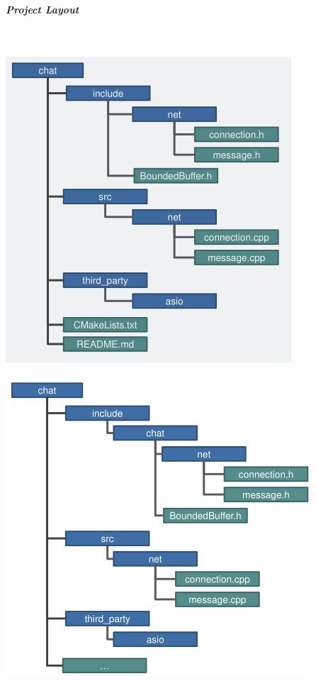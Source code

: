 \documentclass[11pt,twoside,landscape]{article}
\begin{document}
\begin{multicols}{2}
\subparagraph{Project Layout} \
\label{sec:orga0b30ba}
{
\begin{center}
\includegraphics[width=.9\linewidth]{img/cpp_project_layout_app.png}
\end{center}
\label{fig:recomended-project-layout-for-an-application}
}


{
\begin{center}
\includegraphics[width=.9\linewidth]{img/cpp_project_layout_library.png}
\end{center}
\label{fig:recomended-project-layout-for-a-library}
}

\end{multicols}
\end{document}
